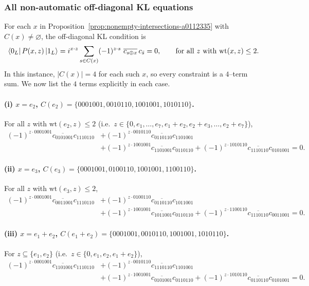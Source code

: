 \documentclass[11pt]{article}
\newcommand{\wt}{\mathrm{wt}}
\begin{document}
\subsubsection*{All non-automatic off-diagonal KL equations}
For each $x$ in Proposition~\ref{prop:nonempty-intersections-a0112335} with $C(x)\neq\varnothing$, the off-diagonal KL condition is
\begin{equation}
\bra{0_L}P(x,z)\ket{1_L}
=
i^{x\cdot z}\sum_{s\in C(x)} (-1)^{z\cdot s}\ \overline{c_{s\oplus x}}\,c_{\bar s}=0,
\qquad
\text{for all $z$ with $\wt(x,z)\le 2$.}
\label{eq:offdiag-master}
\end{equation}
In this instance, $|C(x)|=4$ for each such $x$, so every constraint is a $4$--term sum.
We now list the $4$ terms explicitly in each case.

\paragraph{(i) $x=e_2$, $C(e_2)=\{0001001,0010110,1001001,1010110\}$.}
For all $z$ with $\wt(e_2,z)\le 2$ (i.e.\ $z\in\{0,e_1,\dots,e_7,e_1{+}e_2,e_2{+}e_3,\dots,e_2{+}e_7\}$),
\begin{align}
(-1)^{z\cdot 0001001}\overline{c_{0101001}}c_{1110110}
&+(-1)^{z\cdot 0010110}\overline{c_{0110110}}c_{1101001}\nonumber\\
&+(-1)^{z\cdot 1001001}\overline{c_{1101001}}c_{0110110}
+(-1)^{z\cdot 1010110}\overline{c_{1110110}}c_{0101001}=0.
\label{eq:offdiag-e2}
\end{align}

\paragraph{(ii) $x=e_3$, $C(e_3)=\{0001001,0100110,1001001,1100110\}$.}
For all $z$ with $\wt(e_3,z)\le 2$,
\begin{align}
(-1)^{z\cdot 0001001}\overline{c_{0011001}}c_{1110110}
&+(-1)^{z\cdot 0100110}\overline{c_{0110110}}c_{1011001}\nonumber\\
&+(-1)^{z\cdot 1001001}\overline{c_{1011001}}c_{0110110}
+(-1)^{z\cdot 1100110}\overline{c_{1110110}}c_{0011001}=0.
\label{eq:offdiag-e3}
\end{align}

\paragraph{(iii) $x=e_1+e_2$, $C(e_1{+}e_2)=\{0001001,0010110,1001001,1010110\}$.}
For $z\subseteq\{e_1,e_2\}$ (i.e.\ $z\in\{0,e_1,e_2,e_1{+}e_2\}$),
\begin{align}
(-1)^{z\cdot 0001001}\overline{c_{1101001}}c_{1110110}
&+(-1)^{z\cdot 0010110}\overline{c_{1110110}}c_{1101001}\nonumber\\
&+(-1)^{z\cdot 1001001}\overline{c_{0101001}}c_{0110110}
+(-1)^{z\cdot 1010110}\overline{c_{0110110}}c_{0101001}=0.
\label{eq:offdiag-e1e2}
\end{align}
\end{document}
